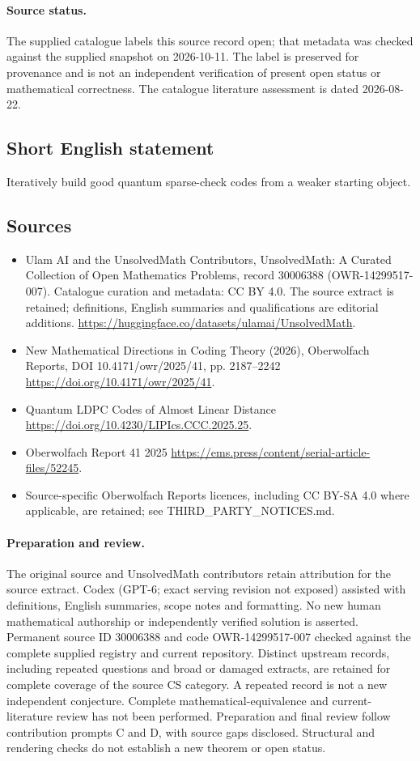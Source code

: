\documentclass[11pt]{article}
\begin{document}
\paragraph{Source status.}
The supplied catalogue labels this source record open; that metadata was checked against the supplied snapshot on 2026-10-11. The label is preserved for provenance and is not an independent verification of present open status or mathematical correctness. The catalogue literature assessment is dated 2026-08-22.
\subsection{Short English statement}
Iteratively build good quantum sparse-check codes from a weaker starting object.
\subsection{Sources}
\begin{itemize}
\item[\hypertarget{source:30006388:1}{S1}] Ulam AI and the UnsolvedMath Contributors, UnsolvedMath: A Curated Collection of Open Mathematics Problems, record 30006388 (OWR-14299517-007). Catalogue curation and metadata: CC BY 4.0. The source extract is retained; definitions, English summaries and qualifications are editorial additions.
\url{https://huggingface.co/datasets/ulamai/UnsolvedMath}.
\item[\hypertarget{source:30006388:2}{S2}] New Mathematical Directions in Coding Theory (2026), Oberwolfach Reports, DOI 10.4171/owr/2025/41, pp. 2187--2242
\url{https://doi.org/10.4171/owr/2025/41}.
\item[\hypertarget{source:30006388:3}{S3}] Quantum LDPC Codes of Almost Linear Distance
\url{https://doi.org/10.4230/LIPIcs.CCC.2025.25}.
\item[\hypertarget{source:30006388:4}{S4}] Oberwolfach Report 41 2025
\url{https://ems.press/content/serial-article-files/52245}.
\item Source-specific Oberwolfach Reports licences, including CC BY-SA 4.0 where applicable, are retained; see THIRD\_PARTY\_NOTICES.md.
\end{itemize}
\paragraph{Preparation and review.}
The original source and UnsolvedMath contributors retain attribution for the source extract. Codex (GPT-6; exact serving revision not exposed) assisted with definitions, English summaries, scope notes and formatting. No new human mathematical authorship or independently verified solution is asserted. Permanent source ID 30006388 and code OWR-14299517-007 checked against the complete supplied registry and current repository. Distinct upstream records, including repeated questions and broad or damaged extracts, are retained for complete coverage of the source CS category. A repeated record is not a new independent conjecture. Complete mathematical-equivalence and current-literature review has not been performed. Preparation and final review follow contribution prompts C and D, with source gaps disclosed. Structural and rendering checks do not establish a new theorem or open status.
\label{end:30006388}
\end{document}
